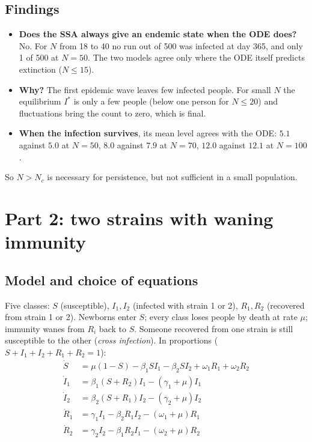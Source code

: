 \documentclass[11pt,a4paper]{article}
\begin{document}
\subsection{Findings}

\begin{itemize}
  \item \textbf{Does the SSA always give an endemic state when the ODE does?} No. For $N$ from 18 to 40 no run out of 500 was infected at day 365, and only 1 of 500 at $N=50$. The two models agree only where the ODE itself predicts extinction ($N\le 15$).
  \item \textbf{Why?} The first epidemic wave leaves few infected people. For small $N$ the equilibrium $I^*$ is only a few people (below one person for $N\le 20$) and fluctuations bring the count to zero, which is final.
  \item \textbf{When the infection survives}, its mean level agrees with the ODE: $5.1$ against $5.0$ at $N=50$, $8.0$ against $7.9$ at $N=70$, $12.0$ against $12.1$ at $N=100$.
\end{itemize}
So $N>N_c$ is necessary for persistence, but not sufficient in a small population.

\section{Part 2: two strains with waning immunity}

\subsection{Model and choice of equations}

Five classes: $S$ (susceptible), $I_1,I_2$ (infected with strain 1 or 2), $R_1,R_2$ (recovered from strain 1 or 2). Newborns enter $S$; every class loses people by death at rate $\mu$; immunity wanes from $R_i$ back to $S$. Someone recovered from one strain is still susceptible to the other (\emph{cross infection}). In proportions ($S+I_1+I_2+R_1+R_2=1$):
\begin{align}
\dot S&=\mu(1-S)-\beta_1SI_1-\beta_2SI_2+\omega_1R_1+\omega_2R_2\\
\dot I_1&=\beta_1(S+R_2)I_1-(\gamma_1+\mu)I_1\\
\dot I_2&=\beta_2(S+R_1)I_2-(\gamma_2+\mu)I_2\\
\dot R_1&=\gamma_1I_1-\beta_2R_1I_2-(\omega_1+\mu)R_1\\
\dot R_2&=\gamma_2I_2-\beta_1R_2I_1-(\omega_2+\mu)R_2
\end{align}
\end{document}
